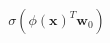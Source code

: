 \documentclass[preview]{standalone}
\begin{document}
\begin{align*}
\sigma(\phi(\mathbf{x})^T\mathbf{w}_0)
\end{align*}
\end{document}
